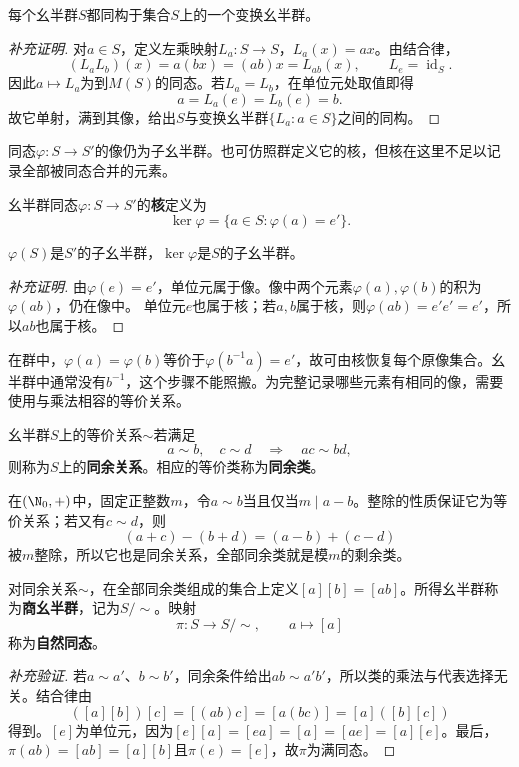 \begin{theorem}
每个幺半群$S$都同构于集合$S$上的一个变换幺半群。
\end{theorem}
\begin{proof}[补充证明]
对$a\in S$，定义左乘映射$L_a:S\to S$，$L_a(x)=ax$。由结合律，
\[
(L_aL_b)(x)=a(bx)=(ab)x=L_{ab}(x),
\qquad L_e=\operatorname{id}_S.
\]
因此$a\mapsto L_a$为到$M(S)$的同态。若$L_a=L_b$，在单位元处取值即得
\[
a=L_a(e)=L_b(e)=b.
\]
故它单射，满到其像，给出$S$与变换幺半群$\{L_a:a\in S\}$之间的同构。
\end{proof}

同态$\varphi:S\to S'$的像仍为子幺半群。也可仿照群定义它的核，但核在这里不足以记录全部被同态合并的元素。

\begin{definition}
幺半群同态$\varphi:S\to S'$的\textbf{核}定义为
\[
\ker\varphi=\{a\in S:\varphi(a)=e'\}.
\]
\end{definition}
\begin{proposition}
$\varphi(S)$是$S'$的子幺半群，$\ker\varphi$是$S$的子幺半群。
\end{proposition}
\begin{proof}[补充证明]
由$\varphi(e)=e'$，单位元属于像。像中两个元素$\varphi(a),\varphi(b)$的积为$\varphi(ab)$，仍在像中。
单位元$e$也属于核；若$a,b$属于核，则$\varphi(ab)=e'e'=e'$，所以$ab$也属于核。
\end{proof}

在群中，$\varphi(a)=\varphi(b)$等价于$\varphi(b^{-1}a)=e'$，故可由核恢复每个原像集合。幺半群中通常没有$b^{-1}$，这个步骤不能照搬。为完整记录哪些元素有相同的像，需要使用与乘法相容的等价关系。

\begin{definition}
幺半群$S$上的等价关系$\sim$若满足
\[
a\sim b,\quad c\sim d\quad\Longrightarrow\quad ac\sim bd,
\]
则称为$S$上的\textbf{同余关系}。相应的等价类称为\textbf{同余类}。
\end{definition}

\begin{example}
在$(\N_0,+)$中，固定正整数$m$，令$a\sim b$当且仅当$m\mid a-b$。整除的性质保证它为等价关系；若又有$c\sim d$，则
\[
(a+c)-(b+d)=(a-b)+(c-d)
\]
被$m$整除，所以它也是同余关系，全部同余类就是模$m$的剩余类。
\end{example}

\begin{definition}
对同余关系$\sim$，在全部同余类组成的集合上定义$[a][b]=[ab]$。所得幺半群称为\textbf{商幺半群}，记为$S/{\sim}$。映射
\[
\pi:S\longrightarrow S/{\sim},\qquad a\longmapsto[a]
\]
称为\textbf{自然同态}。
\end{definition}
\begin{proof}[补充验证]
若$a\sim a'$、$b\sim b'$，同余条件给出$ab\sim a'b'$，所以类的乘法与代表选择无关。结合律由
\[
([a][b])[c]=[(ab)c]=[a(bc)]=[a]([b][c])
\]
得到。$[e]$为单位元，因为$[e][a]=[ea]=[a]=[ae]=[a][e]$。最后，$\pi(ab)=[ab]=[a][b]$且$\pi(e)=[e]$，故$\pi$为满同态。
\end{proof}

